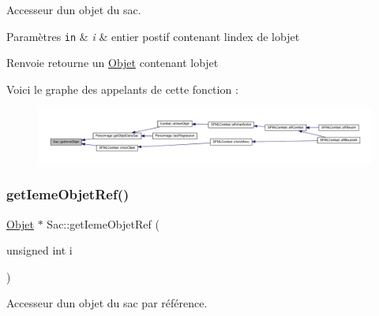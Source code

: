 Accesseur d\textquotesingle{}un objet du sac. 


\begin{DoxyParams}[1]{Paramètres}
\mbox{\tt in}  & {\em i} & entier postif contenant l\textquotesingle{}index de l\textquotesingle{}objet \\
\hline
\end{DoxyParams}
\begin{DoxyReturn}{Renvoie}
retourne un \hyperlink{class_objet}{Objet} contenant l\textquotesingle{}objet 
\end{DoxyReturn}
Voici le graphe des appelants de cette fonction \+:\nopagebreak
\begin{figure}[H]
\begin{center}
\leavevmode
\includegraphics[width=350pt]{class_sac_af8d00752356d84df7e235c8aeded571b_icgraph}
\end{center}
\end{figure}
\mbox{\label{class_sac_a41f03b324ccd719767a473fca7d2e8ec}} 
\subsubsection{\texorpdfstring{get\+Ieme\+Objet\+Ref()}{getIemeObjetRef()}}
{\footnotesize\ttfamily \hyperlink{class_objet}{Objet} $\ast$ Sac\+::get\+Ieme\+Objet\+Ref (\begin{DoxyParamCaption}\item[{unsigned int}]{i }\end{DoxyParamCaption})}



Accesseur d\textquotesingle{}un objet du sac par référence. 


